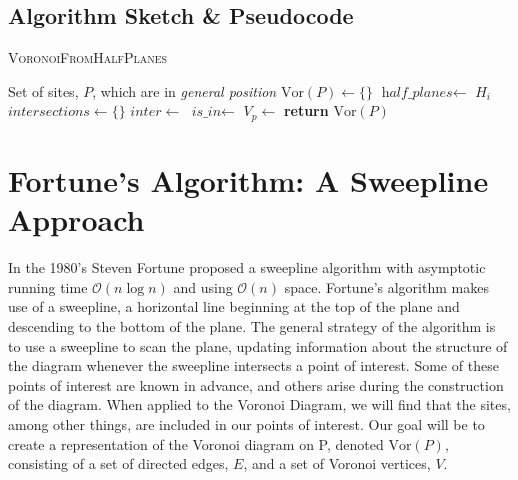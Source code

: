 \documentclass[12pt,twoside]{reedthesis}
\begin{document}
    \subsection{Algorithm Sketch \& Pseudocode} %
    \label{sub:alg_sketch_brutal}
      \begin{algorithm}[H]
      \caption{\textsc{VoronoiFromHalfPlanes}}\label{VoronoiHalfPlane}
      \begin{algorithmic}[1]
      \Require Set of sites, $P$, which are in \emph{general position}
      \State $\mbox{Vor}(P)\gets \{\} $
        \State $\textit{half\_planes}\gets$ $H_{i}$  
        \State $\textit{intersections}\gets \{\} $ 
          \State $inter \gets$ 
          \State $\textit{is\_in}\gets$ 
            \State {}
          \EndIf
        \EndFor
        \State $V_{p}\gets$
        \State {}
      \EndFor
      \State \textbf{return} $\mbox{Vor}(P)$
      \EndProcedure
      \end{algorithmic} 
      \end{algorithm}


  

  \section{Fortune's Algorithm: A Sweepline Approach} %
  \label{sec:fortune_s_algorithm}
    In the 1980's Steven Fortune proposed a sweepline algorithm with asymptotic running time $\mathcal{O}(n\log n)$ and using $\mathcal{O}(n)$ space. Fortune's algorithm makes use of a sweepline, a horizontal line beginning at the top of the plane and descending to the bottom of the plane. The general strategy of the algorithm is to use a sweepline to scan the plane, updating information about the structure of the diagram whenever the sweepline intersects a point of interest. Some of these points of interest are known in advance, and others arise during the construction of the diagram. When applied to the Voronoi Diagram, we will find that the sites, among other things, are included in our points of interest. Our goal will be to create a representation of the Voronoi diagram on P, denoted $\mbox{Vor}(P)$, consisting of a set of directed edges, $E$, and a set of Voronoi vertices, $V$.
\end{document}
